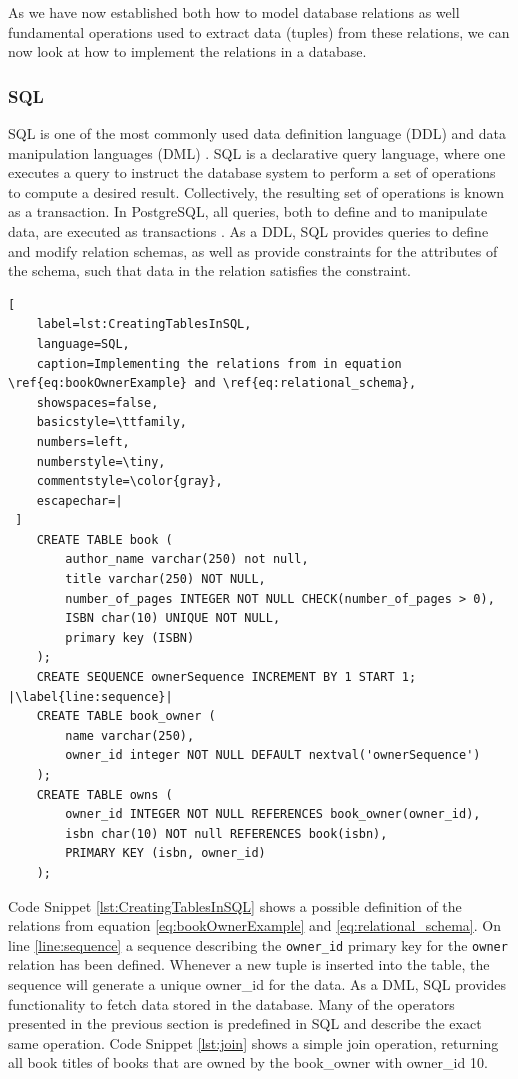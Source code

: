As we have now established both how to model database relations as well fundamental operations used to extract data (tuples) from these relations, we can now look at how to implement the relations in a database.

\subsubsection{SQL}\label{sec:SQL}
SQL is one of the most commonly used data definition language (DDL) and data manipulation languages (DML) \cite{DBSBook}.
SQL is a declarative query language, where one executes a query to instruct the database system to perform a set of operations to compute a desired result. 
Collectively, the resulting set of operations is known as a transaction.
In PostgreSQL, all queries, both to define and to manipulate data, are executed as transactions \cite{postgres_transactions}.
As a DDL, SQL provides queries to define and modify relation schemas, as well as provide constraints for the attributes of the schema, such that data in the relation satisfies the constraint.  

\begin{lstlisting}[
    label=lst:CreatingTablesInSQL,
    language=SQL,
    caption=Implementing the relations from in equation \ref{eq:bookOwnerExample} and \ref{eq:relational_schema},
    showspaces=false,
    basicstyle=\ttfamily,
    numbers=left,
    numberstyle=\tiny,
    commentstyle=\color{gray},
    escapechar=|
 ]
    CREATE TABLE book (
        author_name varchar(250) not null,
        title varchar(250) NOT NULL,
        number_of_pages INTEGER NOT NULL CHECK(number_of_pages > 0),
        ISBN char(10) UNIQUE NOT NULL,
        primary key (ISBN)
    );
    CREATE SEQUENCE ownerSequence INCREMENT BY 1 START 1; |\label{line:sequence}|
    CREATE TABLE book_owner (
        name varchar(250),
        owner_id integer NOT NULL DEFAULT nextval('ownerSequence')
    );
    CREATE TABLE owns (
        owner_id INTEGER NOT NULL REFERENCES book_owner(owner_id),
        isbn char(10) NOT null REFERENCES book(isbn),
        PRIMARY KEY (isbn, owner_id)
    );
\end{lstlisting}

Code Snippet \ref{lst:CreatingTablesInSQL} shows a possible definition of the relations from equation \ref{eq:bookOwnerExample} and \ref{eq:relational_schema}.
On line \ref{line:sequence} a sequence describing the \texttt{owner\_id} primary key for the \texttt{owner} relation has been defined.
Whenever a new tuple is inserted into the table, the sequence will generate a unique owner\_id for the data.
As a DML, SQL provides functionality to fetch data stored in the database. 
Many of the operators presented in the previous section is predefined in SQL and describe the exact same operation. 
Code Snippet \ref{lst:join} shows a simple join operation, returning all book titles of books that are owned by the book\_owner with owner\_id 10.

